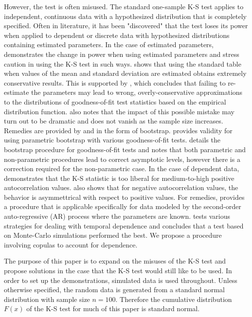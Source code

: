 \documentclass[12pt, letterpaper, titlepage]{article}
\begin{document}
However, the test is often misused. The standard one-sample K-S test applies to 
independent, continuous data with a hypothesized distribution that is completely specified. 
Often in literature, it has been "discovered" that the test loses its power when 
applied to dependent or discrete data with hypothesized distributions containing 
estimated parameters. In the case of estimated parameters, \citet{Steinskog} 
demonstrates the change in power when using estimated parameters and stress caution in 
using the K-S test in such ways. \citet{Lilliefors} shows 
that using the standard table when values of the mean and standard deviation are 
estimated obtains extremely conservative results. This is supported by \citet{Capasso}, which 
concludes that failing to re-estimate the parameters may lead to wrong, overly-conservative 
approximations to the distributions of goodness-of-fit test statistics based on the empirical 
distribution function. \citet{Capasso} also notes that the impact of this possible mistake 
may turn out to be dramatic and does not vanish as the sample size increases. Remedies are provided 
by \citet{Genest} and \citet{Babu} in the form of bootstrap. \citet{Genest} provides validity 
for using parametric bootstrap with various goodness-of-fit tests. \citet{Babu} details 
the bootstrap procedure for goodness-of-fit tests and notes that both parametric and 
non-parametric procedures lead to correct asymptotic levels, however there is a correction 
required for the non-parametric case. In the case of dependent data, \citet{Durilleul} demonstrates 
that the K-S statistic is too liberal for medium-to-high positive autocorrelation values. 
\citet{Durilleul} also shows that for negative autocorrelation values, the behavior is 
asymmettrical with respect to positive values. For remedies, \citet{Weiss} provides a 
procedure that is applicable specifically for data modeled by the second-order auto-regressive (AR) process 
where the parameters are known. \citet{Lanzante} tests various strategies for dealing with temporal dependence
and concludes that a test based on Monte-Carlo simulations performed the best.
We propose a procedure involving copulas to account for dependence.

The purpose of this paper is to expand on the misuses of the K-S test and propose 
solutions in the case that the K-S test would still like to be used. In order to set 
up the demonstrations, simulated data is used throughout. Unless otherwise specified, 
the random data is generated from a standard normal distribution with sample size $n = 100$. 
Therefore the cumulative distribution $F(x)$ of the K-S test for much of this paper is standard normal.
\end{document}
